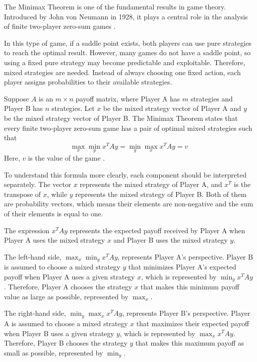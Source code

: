 \documentclass[12pt,a4paper]{article}
\begin{document}
The Minimax Theorem is one of the fundamental results in game theory. Introduced by John von Neumann in 1928, it plays a central role in the analysis of finite two-player zero-sum games \cite{thie2008}.

In this type of game, if a saddle point exists, both players can use pure strategies to reach the optimal result. However, many games do not have a saddle point, so using a fixed pure strategy may become predictable and exploitable. Therefore, mixed strategies are needed. Instead of always choosing one fixed action, each player assigns probabilities to their available strategies.

Suppose \(A\) is an \(m \times n\) payoff matrix, where Player A has \(m\) strategies and Player B has \(n\) strategies. Let \(x\) be the mixed strategy vector of Player A and \(y\) be the mixed strategy vector of Player B. The Minimax Theorem states that every finite two-player zero-sum game has a pair of optimal mixed strategies such that
\[
\max_x \min_y x^T A y = \min_y \max_x x^T A y = v
\]
Here, \(v\) is the value of the game \cite{thie2008}.

To understand this formula more clearly, each component should be interpreted separately. The vector \(x\) represents the mixed strategy of Player A, and \(x^T\) is the transpose of \(x\), while \(y\) represents the mixed strategy of Player B. Both of them are probability vectors, which means their elements are non-negative and the sum of their elements is equal to one. 

The expression \(x^T A y\) represents the expected payoff received by Player A when Player A uses the mixed strategy \(x\) and Player B uses the mixed strategy \(y\).

The left-hand side, \(\max_x \min_y x^T A y\), represents Player A's perspective. Player B is assumed to choose a mixed strategy \(y\) that minimizes Player A's expected payoff when Player A uses a given strategy \(x\), which is represented by \(\min_y x^T A y\). Therefore, Player A chooses the strategy \(x\) that makes this minimum payoff value as large as possible, represented by \(\max_x\).

The right-hand side, \(\min_y \max_x x^T A y\), represents Player B's perspective. Player A is assumed to choose a mixed strategy \(x\) that maximizes their expected payoff when Player B uses a given strategy \(y\), which is represented by \(\max_x x^T A y\). Therefore, Player B chooses the strategy \(y\) that makes this maximum payoff as small as possible, represented by \(\min_y\).
\end{document}
